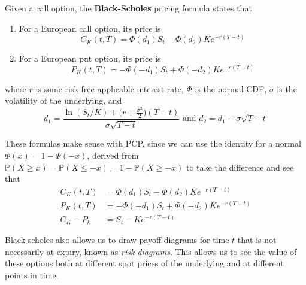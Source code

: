 \documentclass{article}
\begin{document}
    \begin{definition}
      Given a call option, the \textbf{Black-Scholes} pricing formula states that 
      \begin{enumerate}
        \item For a European call option, its price is 
        \begin{equation}
          C_K (t, T) = \Phi(d_1) S_t - \Phi (d_2) K e^{-r (T - t)}
        \end{equation}

        \item For a European put option, its price is 
        \begin{equation}
          P_K (t, T) = -\Phi(-d_1) S_t + \Phi (-d_2) K e^{-r (T - t)}
        \end{equation}
      \end{enumerate}
      where $r$ is some risk-free applicable interest rate, $\Phi$ is the normal CDF, $\sigma$ is the volatility of the underlying, and 
      \begin{equation}
        d_1 = \frac{\ln (S_t / K) + \big( r + \frac{\sigma^2}{2}\big) (T - t)}{\sigma \sqrt{T - t}} \text{ and } d_2 = d_1 - \sigma \sqrt{T - t}
      \end{equation}
    \end{definition}

    These formulas make sense with PCP, since we can use the identity for a normal $\Phi(x) = 1 - \Phi(-x)$, derived from $\mathbb{P}(X \geq x) = \mathbb{P}(X \leq -x) = 1 - \mathbb{P}(X \geq -x)$ to take the difference and see that 
    \begin{align*}
          C_K (t, T) & = \Phi(d_1) S_t - \Phi (d_2) K e^{-r (T - t)} \\ 
          P_K (t, T) & = -\Phi(-d_1) S_t + \Phi (-d_2) K e^{-r (T - t)} \\
          C_K  - P_k & = S_t - K e^{-r (T - t)}
    \end{align*}

    Black-scholes also allows us to draw payoff diagrams for time $t$ that is not necessarily at expiry, known as \textit{risk diagrams}. This allows us to see the value of these options both at different spot prices of the underlying and at different points in time. 
\end{document}
